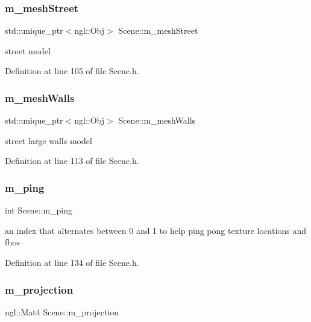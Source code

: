 \subsubsection{m\_meshStreet}
{\footnotesize\ttfamily std\+::unique\+\_\+ptr$<$ngl\+::\+Obj$>$ Scene\+::m\+\_\+mesh\+Street\hspace{0.3cm}{\ttfamily [private]}}



street model 



Definition at line 105 of file Scene.\+h.

\mbox{\label{class_scene_a2665d0d47e82013373dffc9699294e1c}} 
\subsubsection{m\_meshWalls}
{\footnotesize\ttfamily std\+::unique\+\_\+ptr$<$ngl\+::\+Obj$>$ Scene\+::m\+\_\+mesh\+Walls\hspace{0.3cm}{\ttfamily [private]}}



street large walls model 



Definition at line 113 of file Scene.\+h.

\mbox{\label{class_scene_a7bfca8639e9dfe479c1e93b75cd682c2}} 
\subsubsection{m\_ping}
{\footnotesize\ttfamily int Scene\+::m\+\_\+ping\hspace{0.3cm}{\ttfamily [private]}}



an index that alternates between 0 and 1 to help ping pong texture locations and fbos 



Definition at line 134 of file Scene.\+h.

\mbox{\label{class_scene_a610be5a7a01276caef3c3413f5f68fe6}} 
\subsubsection{m\_projection}
{\footnotesize\ttfamily ngl\+::\+Mat4 Scene\+::m\+\_\+projection\hspace{0.3cm}{\ttfamily [private]}}



